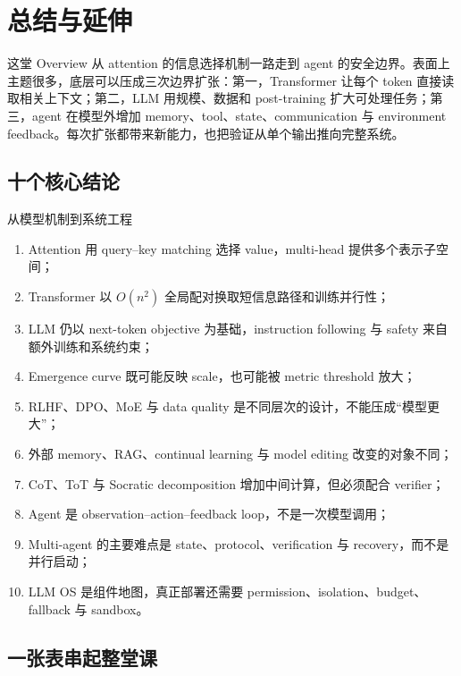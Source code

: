 \section{总结与延伸}

这堂 Overview 从 attention 的信息选择机制一路走到 agent 的安全边界。表面上主题很多，底层可以压成三次边界扩张：第一，Transformer 让每个 token 直接读取相关上下文；第二，LLM 用规模、数据和 post-training 扩大可处理任务；第三，agent 在模型外增加 memory、tool、state、communication 与 environment feedback。每次扩张都带来新能力，也把验证从单个输出推向完整系统。

\subsection{十个核心结论}

\begin{importantbox}{从模型机制到系统工程}
\begin{enumerate}
  \item Attention 用 query--key matching 选择 value，multi-head 提供多个表示子空间；
  \item Transformer 以 $O(n^2)$ 全局配对换取短信息路径和训练并行性；
  \item LLM 仍以 next-token objective 为基础，instruction following 与 safety 来自额外训练和系统约束；
  \item Emergence curve 既可能反映 scale，也可能被 metric threshold 放大；
  \item RLHF、DPO、MoE 与 data quality 是不同层次的设计，不能压成“模型更大”；
  \item 外部 memory、RAG、continual learning 与 model editing 改变的对象不同；
  \item CoT、ToT 与 Socratic decomposition 增加中间计算，但必须配合 verifier；
  \item Agent 是 observation--action--feedback loop，不是一次模型调用；
  \item Multi-agent 的主要难点是 state、protocol、verification 与 recovery，而不是并行启动；
  \item LLM OS 是组件地图，真正部署还需要 permission、isolation、budget、fallback 与 sandbox。
\end{enumerate}
\end{importantbox}

\subsection{一张表串起整堂课}

